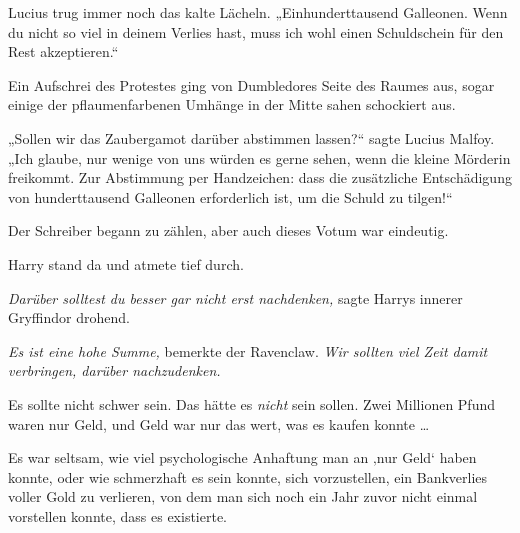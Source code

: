Lucius trug immer noch das kalte Lächeln.
„Einhunderttausend Galleonen. Wenn du nicht so viel in deinem Verlies hast, muss ich wohl einen Schuldschein für den Rest akzeptieren.“

Ein Aufschrei des Protestes ging von Dumbledores Seite des Raumes aus, sogar einige der pflaumenfarbenen Umhänge in der Mitte sahen schockiert aus.

„Sollen wir das Zaubergamot darüber abstimmen lassen?“ sagte Lucius Malfoy.
„Ich glaube, nur wenige von uns würden es gerne sehen, wenn die kleine Mörderin freikommt. Zur Abstimmung per Handzeichen: dass die zusätzliche Entschädigung von hunderttausend Galleonen erforderlich ist, um die Schuld zu tilgen!“

Der Schreiber begann zu zählen, aber auch dieses Votum war eindeutig.

Harry stand da und atmete tief durch.

\emph{Darüber solltest du besser gar nicht erst nachdenken,} sagte Harrys innerer Gryffindor drohend.

\emph{Es ist eine hohe Summe,} bemerkte der Ravenclaw. \emph{Wir sollten viel Zeit damit verbringen, darüber nachzudenken.}

Es sollte nicht schwer sein. Das hätte es \emph{nicht} sein sollen. Zwei Millionen Pfund waren nur Geld, und Geld war nur das wert, was es kaufen konnte …

Es war seltsam, wie viel psychologische Anhaftung man an ‚nur Geld‘ haben konnte, oder wie schmerzhaft es sein konnte, sich vorzustellen, ein Bankverlies voller Gold zu verlieren, von dem man sich noch ein Jahr zuvor nicht einmal vorstellen konnte, dass es existierte.

